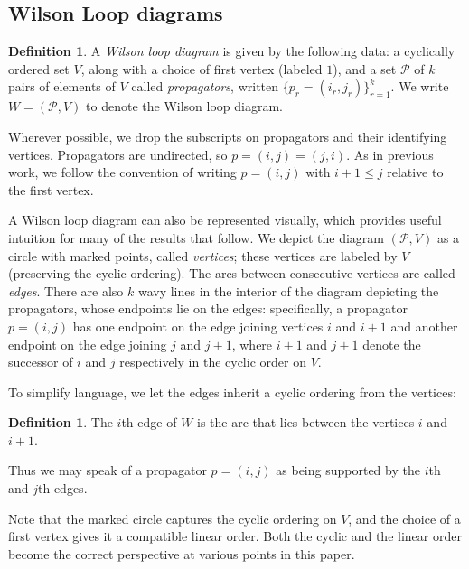 \documentclass[11pt]{article}
\newcommand{\cP}{\mathcal{P}}
\theoremstyle{remark}
\theoremstyle{definition}
\newtheorem{dfn}[thm]{Definition}
\begin{document}
\subsection{Wilson Loop diagrams}\label{section WLD background} 


\begin{dfn}\label{WLdfn}
A {\em Wilson loop diagram} is given by the following data: a cyclically ordered set $V$, along with a choice of first vertex (labeled $1$), and a set $\cP$ of $k$ pairs of elements of $V$ called {\em propagators}, written $\{p_r = (i_r, j_r)\}_{r=1}^k$. We write $W = (\cP,V)$ to denote the Wilson loop diagram. \end{dfn}

Wherever possible, we drop the subscripts on propagators and their identifying vertices. Propagators are undirected, so $p = (i,j) = (j,i)$. As in previous work, we follow the convention of writing $p = (i,j)$ with  $i +1 \leq j$ relative to the first vertex. 

A Wilson loop diagram can also be represented visually, which provides useful intuition for many of the results that follow. We depict the diagram $(\cP,V)$ as a circle with marked points, called {\em vertices}; these vertices are labeled by $V$ (preserving the cyclic ordering). The arcs between consecutive vertices are called {\em edges}. There are also $k$ wavy lines in the interior of the diagram depicting the propagators, whose endpoints lie on the edges: specifically, a propagator $p =(i,j)$ has one endpoint on the edge joining vertices $i$ and $i+1$ and another endpoint on the edge joining $j$ and $j+1$, where $i+1$ and $j+1$ denote the successor of $i$ and $j$ respectively in the cyclic order on $V$. 

To simplify language, we let the edges inherit a cyclic ordering from the vertices:

\begin{dfn}\label{def:edges}
The $i$th edge of $W$ is the arc that lies between the vertices $i$ and $i+1$.
\end{dfn}

Thus we may speak of a propagator $p = (i, j)$ as being supported by the $i$th and $j$th edges.

Note that the marked circle captures the cyclic ordering on $V$, and the choice of a first vertex gives it a compatible linear order. Both the cyclic and the linear order become the correct perspective at various points in this paper. 
\end{document}
